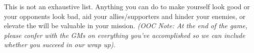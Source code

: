 \documentclass[green]{GL2020}
\begin{document}
This is not an exhaustive list. Anything you can do to make yourself look good or your opponents look bad, aid your allies/supporters and hinder your enemies, or elevate the \pFarm{} will be valuable in your mission. \emph{(OOC Note: At the end of the game, please confer with the GMs on everything you’ve accomplished so we can include whether you succeed in our wrap up).}
\end{document}

